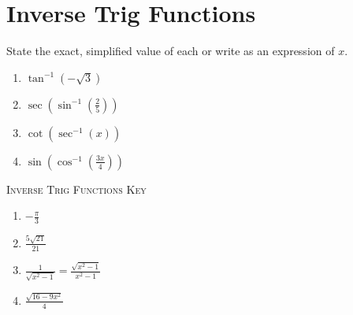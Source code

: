 \chapter{Inverse Trig Functions}

State the exact, simplified value of each or write as an expression of $x$.

\begin{enumerate}
	\item $\tan^{-1}\left(-\sqrt{3}\right)$
	\item $\sec\left(\sin^{-1}\left(\frac{2}{5}\right)\right)$
	\item $\cot\left(\sec^{-1}(x)\right)$
	\item $\sin\left(\cos^{-1}\left(\frac{3x}{4}\right)\right)$
\end{enumerate}

\newpage

\textsc{Inverse Trig Functions Key}

\begin{enumerate}
	\item $-\frac{\pi}{3}$
    \item $\frac{5\sqrt{21}}{21}$
    \item $\frac{1}{\sqrt{x^2-1}} = \frac{\sqrt{x^2-1}}{x^2-1}$
    \item $\frac{\sqrt{16-9x^2}}{4}$
\end{enumerate}

